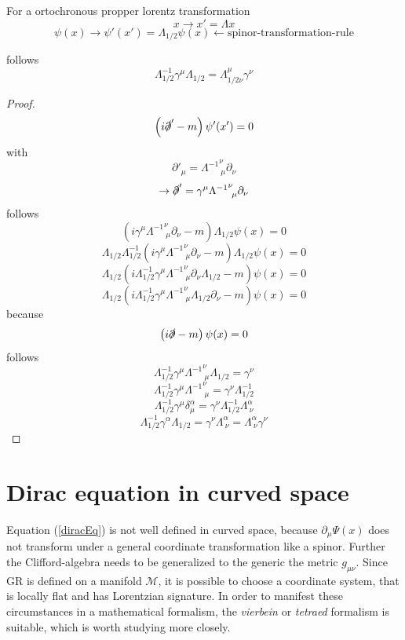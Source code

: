 \documentclass[12pt,a4paper]{article}
\begin{document}
	For a ortochronous propper lorentz transformation
	$$ 
	x \rightarrow x' = \Lambda x
	$$
	$$\psi(x) \rightarrow \psi'(x') = \Lambda_{1/2} \psi(x) \leftarrow \text{spinor-transformation-rule}$$
	
	follows
	$$
	\Lambda_{1/2}^{-1} \gamma^\mu \Lambda_{1/2} = \Lambda^\mu_{1/2 \nu} \gamma^\nu
	$$
	
	\begin{proof}
		$$\left( i \slashed{\partial}' -m \right) \psi '(x') = 0$$ 
		\break
		with
		$$\partial'_\mu = {\Lambda^{-1}}_{\ \mu}^{\nu}  \partial_\nu $$
		$$\rightarrow \slashed{\partial}' = \gamma^\mu {\Lambda^{-1}}_{\ \mu}^{\nu}  \partial_\nu$$
		follows
		$$\left( i \gamma^\mu {\Lambda^{-1}}_{\ \mu}^{\nu}  \partial_\nu -m \right) \Lambda_{1/2} \psi(x) = 0$$ 
		$$ \Lambda_{1/2}  \Lambda_{1/2}^{-1}\left( i \gamma^\mu {\Lambda^{-1}}_{\ \mu}^{\nu}  \partial_\nu -m \right) \Lambda_{1/2} \psi(x) = 0$$ 
		$$ \Lambda_{1/2} \left( i \Lambda_{1/2}^{-1} \gamma^\mu {\Lambda^{-1}}_{\ \mu}^{\nu}  \partial_\nu \Lambda_{1/2} -m \right) \psi(x) = 0$$ 
		$$ \Lambda_{1/2} \left( i \Lambda_{1/2}^{-1} \gamma^\mu {\Lambda^{-1}}_{\ \mu}^{\nu}   \Lambda_{1/2} \partial_\nu -m \right) \psi(x) = 0$$ 
		because
		$$\left( i \slashed{\partial} -m \right) \psi(x) = 0$$
		follows
		$$\Lambda_{1/2}^{-1} \gamma^\mu {\Lambda^{-1}}_{\ \mu}^{\nu}   \Lambda_{1/2} = \gamma^\nu$$
		$$\Lambda_{1/2}^{-1} \gamma^\mu {\Lambda^{-1}}_{\ \mu}^{\nu}   = \gamma^\nu \Lambda_{1/2}^{-1}$$
		$$\Lambda_{1/2}^{-1} \gamma^\mu \delta^\alpha_\mu   = \gamma^\nu \Lambda_{1/2}^{-1}\Lambda^\alpha_{\ \nu}$$
		$$\Lambda_{1/2}^{-1} \gamma^\alpha \Lambda_{1/2} = \gamma^\nu \Lambda^\alpha_{\ \nu}=  \Lambda^\alpha_{\ \nu} \gamma^\nu $$
	\end{proof}
	
	\section{Dirac equation in curved space}
	Equation (\ref{diracEq}) is not well defined in curved space, because $\partial_\mu \Psi(x)$ does not transform under a general coordinate transformation like a spinor. Further the Clifford-algebra needs to be generalized to the generic the metric $g_{\mu \nu}$. Since GR is defined on a manifold $\mathcal{M}$, it is possible to choose a coordinate system, that is locally flat and has Lorentzian signature. In order to manifest these circumstances in a mathematical formalism, the \textit{vierbein} or \textit{tetraed} formalism is suitable, which is worth studying more closely.
	
\end{document}
